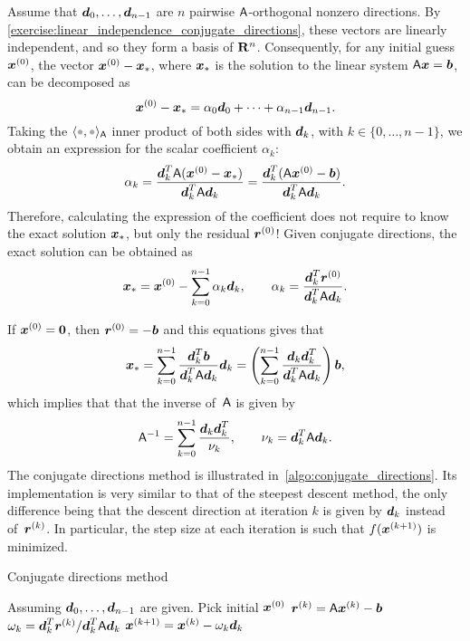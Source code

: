 Assume that $\mathbf{\boldsymbol{d}}_0, \dotsc, \mathbf{\boldsymbol{d}}_{n-1}$ are $n$ pairwise $\mathsf A$-orthogonal nonzero directions.
By \cref{exercise:linear_independence_conjugate_directions},
these vectors are linearly independent,
and so they form a basis of $\mathbf R^n$.
Consequently, for any initial guess $\mathbf{\boldsymbol{x}}^{(0)}$,
the vector $\mathbf{\boldsymbol{x}}^{(0)} - \mathbf{\boldsymbol{x}}_*$,
where $\mathbf{\boldsymbol{x}}_*$ is the solution to the linear system $\mathsf A \mathbf{\boldsymbol{x}} = \mathbf{\boldsymbol{b}}$,
can be decomposed as
\[
    \mathbf{\boldsymbol{x}}^{(0)} - \mathbf{\boldsymbol{x}}_* = \alpha_0 \mathbf{\boldsymbol{d}}_0 + \dotsb + \alpha_{n-1} \mathbf{\boldsymbol{d}}_{n-1}.
\]
Taking the $\ip{\placeholder, \placeholder}_{\mat A}$ inner product of both sides with $\mathbf{\boldsymbol{d}}_k$,
with $k \in \{0, \dotsc, n-1\}$,
we obtain an expression for the scalar coefficient $\alpha_k$:
\[
    \alpha_k = \frac{\mathbf{\boldsymbol{d}}_k^T \mathsf A (\mathbf{\boldsymbol{x}}^{(0)} - \mathbf{\boldsymbol{x}}_*)}{\mathbf{\boldsymbol{d}}_k^T \mathsf A \mathbf{\boldsymbol{d}}_k}
    = \frac{\mathbf{\boldsymbol{d}}_k^T (\mathsf A \mathbf{\boldsymbol{x}}^{(0)} - \mathbf{\boldsymbol{b}})}{\mathbf{\boldsymbol{d}}_k^T \mathsf A \mathbf{\boldsymbol{d}}_k}.
\]
Therefore, calculating the expression of the coefficient does not require to know the exact solution $\mathbf{\boldsymbol{x}}_*$,
but only the residual $\mathbf{\boldsymbol{r}}^{(0)}$!
Given conjugate directions, the exact solution can be obtained as
\begin{equation}
    \label{eq:linear_expansion_conjugate_direction}
    \mathbf{\boldsymbol{x}}_* = \mathbf{\boldsymbol{x}}^{(0)} - \sum_{k=0}^{n-1} \alpha_k \mathbf{\boldsymbol{d}}_k, \qquad \alpha_k = \frac{\mathbf{\boldsymbol{d}}_k^T \mathbf{\boldsymbol{r}}^{(0)}}{\mathbf{\boldsymbol{d}}_k^T \mathsf A \mathbf{\boldsymbol{d}}_k}.
\end{equation}

If $\mathbf{\boldsymbol{x}}^{(0)} = \mathbf{\boldsymbol{0}}$,
then $\mathbf{\boldsymbol{r}}^{(0)} = -\mathbf{\boldsymbol{b}}$ and this equations gives that
\[
    \mathbf{\boldsymbol{x}}_* = \sum_{k=0}^{n-1} \frac{\mathbf{\boldsymbol{d}}_k^T \mathbf{\boldsymbol{b}}}{\mathbf{\boldsymbol{d}}_k^T \mathsf A \mathbf{\boldsymbol{d}}_k} \mathbf{\boldsymbol{d}}_k
    = \left(\sum_{k=0}^{n-1} \frac{\mathbf{\boldsymbol{d}}_k \mathbf{\boldsymbol{d}}_k^T}{\mathbf{\boldsymbol{d}}_k^T \mathsf A \mathbf{\boldsymbol{d}}_k}\right) \mathbf{\boldsymbol{b}},
\]
which implies that that the inverse of~$\mathsf A$ is given by
\[
    \mathsf A^{-1} = \sum_{k=0}^{n-1} \frac{\mathbf{\boldsymbol{d}}_k \mathbf{\boldsymbol{d}}_k^T}{\nu_k}, \qquad \nu_k = \mathbf{\boldsymbol{d}}_k^T \mathsf A \mathbf{\boldsymbol{d}}_k.
\]
The conjugate directions method is illustrated in~\cref{algo:conjugate_directions}.
Its implementation is very similar to that of the steepest descent method,
the only difference being that the descent direction at iteration $k$ is given by $\mathbf{\boldsymbol{d}}_k$ instead of~$\mathbf{\boldsymbol{r}}^{(k)}$.
In particular, the step size at each iteration is such that $f(\mathbf{\boldsymbol{x}}^{(k+1)})$ is minimized.
\begin{algorithm}
    \caption{Conjugate directions method}%
    \label{algo:conjugate_directions}%
    \begin{algorithmic}[1]
        \State Assuming $\mathbf{\boldsymbol{d}}_0, \dotsc, \mathbf{\boldsymbol{d}}_{n-1}$ are given.
        \State Pick initial $\mathbf{\boldsymbol{x}}^{(0)}$
            \State $\mathbf{\boldsymbol{r}}^{(k)} = \mathsf A \mathbf{\boldsymbol{x}}^{(k)} - \mathbf{\boldsymbol{b}}$
            \State $\omega_k = \mathbf{\boldsymbol{d}}_k^T \mathbf{\boldsymbol{r}}^{(k)}/\mathbf{\boldsymbol{d}}_k^T \mathsf A \mathbf{\boldsymbol{d}}_k$
            \State $\mathbf{\boldsymbol{x}}^{(k+1)} = \mathbf{\boldsymbol{x}}^{(k)} - \omega_k \mathbf{\boldsymbol{d}}_k$
        \EndFor
    \end{algorithmic}
\end{algorithm}

